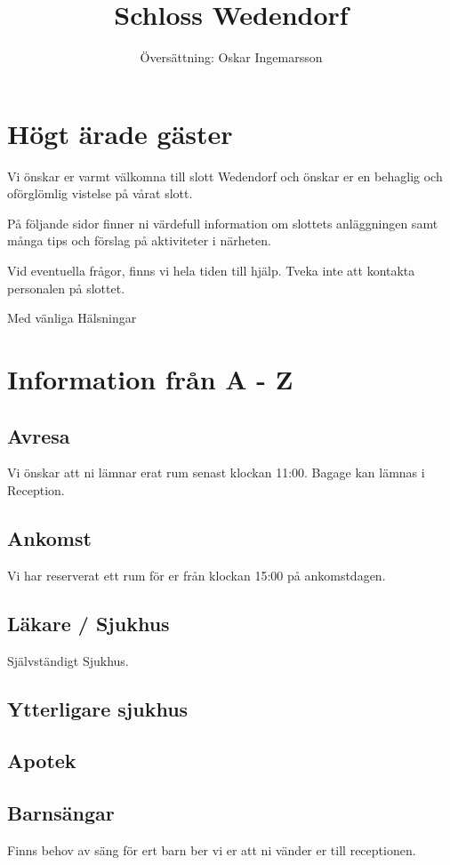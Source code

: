 \documentclass{article}
\title{Schloss Wedendorf}
\author{Översättning: Oskar Ingemarsson}
\begin{document}
\maketitle

\section*{Högt ärade gäster}
Vi önskar er varmt välkomna till slott Wedendorf och önskar er en behaglig och oförglömlig vistelse på
vårat slott.

På följande sidor finner ni värdefull information om slottets anläggningen samt många tips och förslag
på aktiviteter i närheten.

Vid eventuella frågor, finns vi hela tiden till hjälp. Tveka inte att kontakta personalen på slottet.

Med vänliga Hälsningar

\newpage

\section{Information från A - Z}
\subsection{Avresa}
Vi önskar att ni lämnar erat rum senast klockan 11:00. Bagage kan lämnas i Reception.
\subsection{Ankomst}
Vi har reserverat ett rum för er från klockan 15:00 på ankomstdagen.
\subsection{Läkare / Sjukhus}
Självständigt Sjukhus.

\subsection{Ytterligare sjukhus}
\subsection{Apotek}
\subsection{Barnsängar}
Finns behov av säng för ert barn ber vi er att ni vänder er till receptionen.
\end{document}
